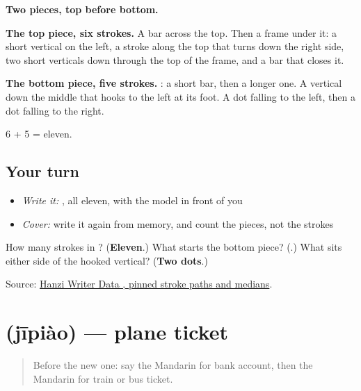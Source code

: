\begin{quote}
\end{quote}

\textbf{Two pieces, top before bottom.}

\textbf{The top piece, six strokes.} A bar across the top. Then a frame under it: a short vertical on the left, a stroke along the top that turns down the right side, two short verticals down through the top of the frame, and a bar that closes it.

\textbf{The bottom piece, five strokes.} : a short bar, then a longer one. A vertical down the middle that hooks to the left at its foot. A dot falling to the left, then a dot falling to the right.

6 + 5 = eleven.

\subsection*{Your turn}
\begin{itemize}
\raggedright
  \item \emph{Write it:} , all eleven, with the model in front of you
  \item \emph{Cover:} write it again from memory, and count the pieces, not the strokes
\end{itemize}

\begin{tcolorbox}[breakable,colback=teal!4,colframe=teal!35!black,title={Before you move on}]
How many strokes in ? (\textbf{Eleven}.) What starts the bottom piece? (\textbf{}.) What sits either side of the hooked vertical? (\textbf{Two dots}.)

Source: \href{https://raw.githubusercontent.com/chanind/hanzi-writer-data/68d10a4b21150cae5e1ebbd223eed289cf32d90c/data/\%E7\%A5\%A8.json}{Hanzi Writer Data , pinned stroke paths and medians}.
\end{tcolorbox}
\section[\texorpdfstring{\zh{机票} (jīpiào)}{机票 (jīpiào)}]{ (jīpiào) — plane ticket}

\label{lesson:ZH-C196-jipiao}



\begin{quote}
Before the new one: say the Mandarin for bank account, then the Mandarin for train or bus ticket.
\end{quote}


